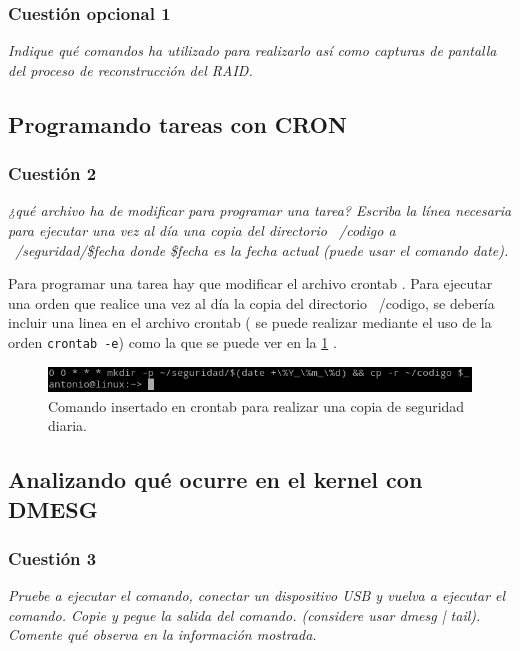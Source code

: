 \subsubsection{Cuestión opcional 1}
\textit{Indique qué comandos ha utilizado para realizarlo así como capturas de pantalla del proceso de reconstrucción del RAID.}
\subsection{Programando tareas con CRON}


\subsubsection{Cuestión 2}
\textit{¿qué archivo ha de modificar para programar una tarea? Escriba la línea necesaria para ejecutar una vez al día una copia del directorio ~/codigo a ~/seguridad/\$fecha donde \$fecha es la fecha actual (puede usar el comando date).}
\newline

Para programar una tarea hay que modificar el archivo crontab \cite{cron} \cite{cron2}. Para ejecutar una orden que realice una vez al día la copia del directorio ~/codigo, se debería incluir una linea en el archivo crontab ( se puede realizar mediante el uso de la orden \texttt{crontab -e}) como la que se puede ver en la  \cref{fig1} \cite{date}.

\begin{figure}[H]
  \begin{center}
    \includegraphics[width=1\textwidth]{imagenes/cron}
    \caption{Comando insertado en crontab para realizar una copia de seguridad diaria.}
    \label{fig1}
  \end{center}
\end{figure}

\subsection{Analizando qué ocurre en el kernel con DMESG}


\subsubsection{Cuestión 3}
\textit{Pruebe a ejecutar el comando, conectar un dispositivo USB y vuelva a ejecutar el comando. Copie y pegue la salida del comando. (considere usar dmesg | tail). Comente qué observa en la información mostrada.}
\newline

